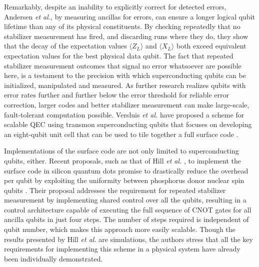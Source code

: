 Remarkably, despite an inability to explicitly correct for detected errors,
Andersen \textit{et al.}, by measuring ancillas for errors, can ensure a longer
logical qubit lifetime than any of its physical constituents. By checking
repeatedly that no stabilizer measurement has fired, and discarding runs where
they do, they show that the decay of the expectation values $\langle Z_L
\rangle$ and $\langle X_L \rangle$ both exceed equivalent expectation values for
the best physical data qubit. The fact that repeated stabilizer measurement
outcomes that signal no error whatsoever are possible here, is a testament to the
precision with which superconducting qubits can be initialized, manipulated and
measured. As further research realizes qubits with error rates further and
further below the error threshold for reliable error correction, larger codes
and better stabilizer measurement can make large-scale, fault-tolerant
computation possible. Versluis \textit{et al.} have proposed a scheme for
scalable QEC using transmon superconducting qubits that focuses on developing an
eight-qubit unit cell that can be used to tile together a full surface code
\cite{Versluis_2017}.

Implementations of the surface code are not only limited to superconducting
qubits, either. Recent proposals, such as that of Hill \textit{et al.} , to
implement the surface code in silicon quantum dots promise to drastically reduce
the overhead per qubit by exploiting the uniformity between phosphorus donor
nuclear spin qubits \cite{silicon_surface_code}. Their proposal addresses the
requirement for repeated stabilizer measurement by implementing shared control
over all the qubits, resulting in a control architecture capable of executing
the full sequence of CNOT gates for all ancilla qubits in just four steps. The
number of steps required is independent of qubit number, which makes this
approach more easily scalable. Though the results presented by Hill \textit{et
  al.} are simulations, the authors stress that all the key requirements for
implementing this scheme in a physical system have already been individually
demonstrated.

